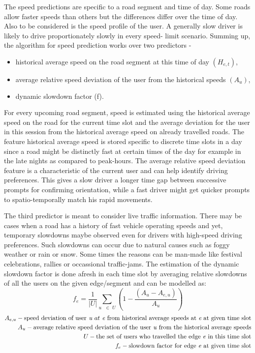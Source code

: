 \documentclass{iitkthesis}
\begin{document}
The speed predictions are specific to a road segment and time of day. 
Some roads allow faster speeds than others but the differences 
differ over the time of day.
Also to be considered is the speed profile of the user. A generally 
slow driver is likely to drive proportionately slowly in every speed-
limit scenario. 
Summing up, the algorithm for speed prediction works over two predictors - 
\begin{itemize}
\item historical average speed on the road segment at this time of day 
$(H_{e,t})$,
\item average relative speed deviation of the user from the historical 
speeds $({A_u})$,
\item dynamic slowdown factor (f).
\end{itemize}

For every upcoming road segment, speed is estimated using the historical 
average speed on the road for the current time slot and the average 
deviation for the user in this session from the historical average speed 
on already travelled roads. 
The feature historical average speed is stored specific to discrete time 
slots in a day since a road might be distinctly fast at certain times of
the day for example in the late nights as compared to 
peak-hours. The average relative speed deviation feature is a
characteristic of the current user and can help identify driving preferences. 
This gives a slow driver a longer time gap between successive prompts for 
confirming orientation, while a fast driver might get quicker prompts 
to spatio-temporally match his rapid movements.  

The third predictor is meant to consider live traffic information. There 
may be cases when a road has a history of fast vehicle operating speeds and 
yet, temporary slowdowns maybe observed even for drivers with high-speed 
driving preferences. Such slowdowns can occur due to natural causes   
such as foggy weather or rain or snow. Some times the reasons can be man-made 
like festival celebrations, rallies or occassional traffic-jams. The 
estimation of the dynamic slowdown factor is 
done afresh in each time slot by averaging relative slowdowns
of all the users on the given edge/segment and can be modelled as:
\[\displaystyle f_{e} = \frac{1}{|U|}\sum_{u \text{ } \in \textit{ U}}(1-\frac{(A_u - A_{e,u})}{A_u})\]  
\begin{align*}
A_{e,u} - \text{speed deviation of user} \textit{ u } at \textit{ e } \text{from historical average speeds at }\textit{e} \text{ at given time slot} \\
A_u - \text{average relative speed deviation of the user \textit{u} from the historical average speeds} \\
U - \text{the set of users who travelled the edge \textit{e} in this time slot} \\
f_e - \text{slowdown factor for edge \textit{e} at given time slot}
\end{align*}
\end{document}

